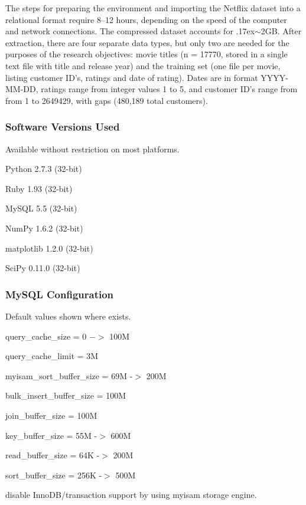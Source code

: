 \documentclass[prodmode,acmtecs]{acmsmall}
\newcommand{\indentitem}{\setlength\itemindent{25pt}}
\begin{document}
The steps for preparing the environment and importing the Netflix dataset into a relational format require 8--12 hours, depending on the speed of the computer and network connections. The compressed dataset \cite{netflix-01} accounts for {\raise.17ex\hbox{$\scriptstyle\mathtt{\sim}$}}2GB. After extraction, there are four separate data types, but only two are needed for the purposes of the research objectives: movie titles (n = 17770, stored in a single text file with title and release year) and the training set (one file per movie, listing customer ID's, ratings and date of rating). Dates are in format YYYY-MM-DD, ratings range from integer values 1 to 5, and customer ID's range from from 1 to 2649429, with gaps (480,189 total customers).

\subsubsection{Software Versions Used} Available without restriction on most platforms.
\begin{itemize}
	{\indentitem\item Python 2.7.3 (32-bit)}
	{\indentitem\item Ruby 1.93 (32-bit)}
	{\indentitem\item MySQL 5.5 (32-bit)}
	{\indentitem\item NumPy 1.6.2 (32-bit)}
	{\indentitem\item matplotlib 1.2.0 (32-bit)}
	{\indentitem\item SciPy 0.11.0 (32-bit)}
\end{itemize}
\subsubsection{MySQL Configuration} Default values shown where exists.
\begin{itemize}
	{\indentitem\item query\_cache\_size = 0 $->$ 100M}
	{\indentitem\item query\_cache\_limit = 3M}
	{\indentitem\item myisam\_sort\_buffer\_size = 69M -$>$ 200M}
	{\indentitem\item bulk\_insert\_buffer\_size = 100M}
	{\indentitem\item join\_buffer\_size = 100M}
	{\indentitem\item key\_buffer\_size = 55M -$>$ 600M}
	{\indentitem\item read\_buffer\_size = 64K -$>$ 200M}
	{\indentitem\item sort\_buffer\_size = 256K -$>$ 500M}
	{\indentitem\item disable InnoDB/transaction support by using myisam storage engine.}
\end{itemize}
\end{document}
